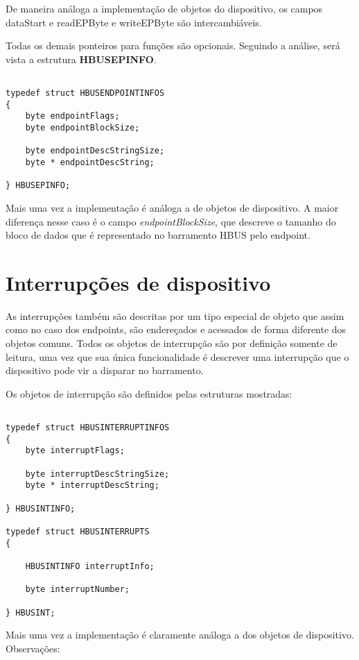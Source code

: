 \documentclass[11pt]{report}
\begin{document}
De maneira análoga a implementação de objetos do dispositivo, os campos dataStart e readEPByte e writeEPByte são intercambiáveis.

Todas os demais ponteiros para funções são opcionais. Seguindo a análise, será vista a estrutura \textbf{HBUSEPINFO}.

\begin{verbatim}

typedef struct HBUSENDPOINTINFOS
{
	byte endpointFlags;
	byte endpointBlockSize;
	
	byte endpointDescStringSize;
	byte * endpointDescString;
	
} HBUSEPINFO;

\end{verbatim}

Mais uma vez a implementação é análoga a de objetos de dispositivo. A maior diferença nesse caso é o campo \textit{endpointBlockSize}, que descreve o tamanho do bloco de dados que é representado no barramento HBUS pelo endpoint.

\section{Interrupções de dispositivo}

As interrupções também são descritas por um tipo especial de objeto que assim como no caso dos endpoints, são endereçados e acessados de forma diferente dos objetos comuns. Todos os objetos de interrupção são por definição somente de leitura, uma vez que sua única funcionalidade é descrever uma interrupção que o dispositivo pode vir a disparar no barramento.

Os objetos de interrupção são definidos pelas estruturas mostradas:

\begin{verbatim}

typedef struct HBUSINTERRUPTINFOS
{
	byte interruptFlags;
	
	byte interruptDescStringSize;
	byte * interruptDescString;
	
} HBUSINTINFO;

typedef struct HBUSINTERRUPTS
{
	
	HBUSINTINFO interruptInfo;
	
	byte interruptNumber;
	
} HBUSINT;

\end{verbatim}

Mais uma vez a implementação é claramente análoga a dos objetos de dispositivo. Observações:
\end{document}
